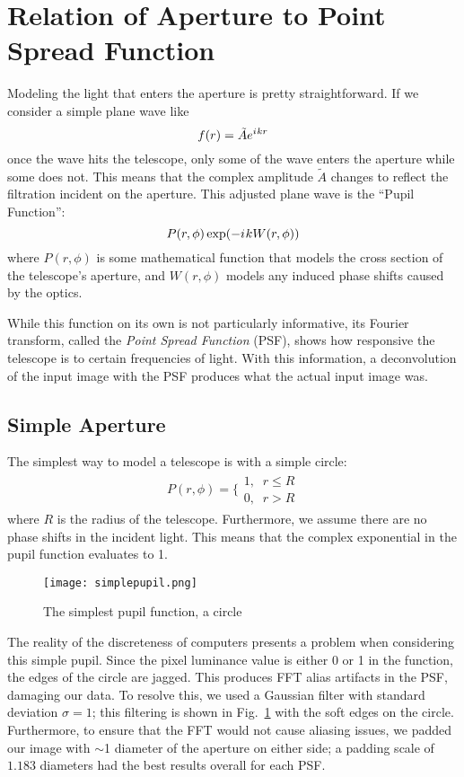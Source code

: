 \documentclass[%
 reprint,
 amsmath,amssymb,
 aps,
 pra,
]{revtex4-1}
\newcommand{\iu}{{i\mkern1mu}}
\begin{document}
{\section{\label{sec:aperture-psf}Relation of Aperture to Point Spread Function}

Modeling the light that enters the aperture is pretty straightforward. If we consider a simple plane wave like \[f(r)=\tilde{A}e^{\iu kr}\] once the wave hits the telescope, only some of the wave enters the aperture while some does not. This means that the complex amplitude $\tilde{A}$ changes to reflect the filtration incident on the aperture. This adjusted plane wave is the ``Pupil Function'':
\begin{equation}
  P(r, \phi)\exp(-\iu k W(r, \phi)) \label{eq:pupilFunc}
\end{equation}
where $P(r,\phi)$ is some mathematical function that models the cross section of the telescope's aperture, and $W(r, \phi)$ models any induced phase shifts caused by the optics.

While this function on its own is not particularly informative, its Fourier transform, called the \textit{Point Spread Function} (PSF), shows how responsive the telescope is to certain frequencies of light. With this information, a deconvolution of the input image with the PSF produces what the actual input image was.

\subsection{Simple Aperture}\label{subsec:simple-aperture}

The simplest way to model a telescope is with a simple circle:
\begin{align*}
  P(r, \phi) = \bigg\lbrace\begin{array}{c}
  	1,\;\;r \leq R \\ 
    0,\;\; r > R
  \end{array}
\end{align*}
where $R$ is the radius of the telescope. Furthermore, we assume there are no phase shifts in the incident light. This means that the complex exponential in the pupil function evaluates to 1.

\begin{figure}[h!]
  \centering
    \texttt{[image: simplepupil.png]}
  \caption{The simplest pupil function, a circle}\label{fig:simplepupil}
\end{figure}

The reality of the discreteness of computers presents a problem when considering this simple pupil. Since the pixel luminance value is either 0 or 1 in the function, the edges of the circle are jagged. This produces FFT alias artifacts in the PSF, damaging our data. To resolve this, we used a Gaussian filter with standard deviation $\sigma = 1$; this filtering is shown in Fig.~\ref{fig:simplepupil} with the soft edges on the circle. Furthermore, to ensure that the FFT would not cause aliasing issues, we padded our image with $\sim$1 diameter of the aperture on either side; a padding scale of $1.183$ diameters had the best results overall for each PSF\@.

}
\end{document}
